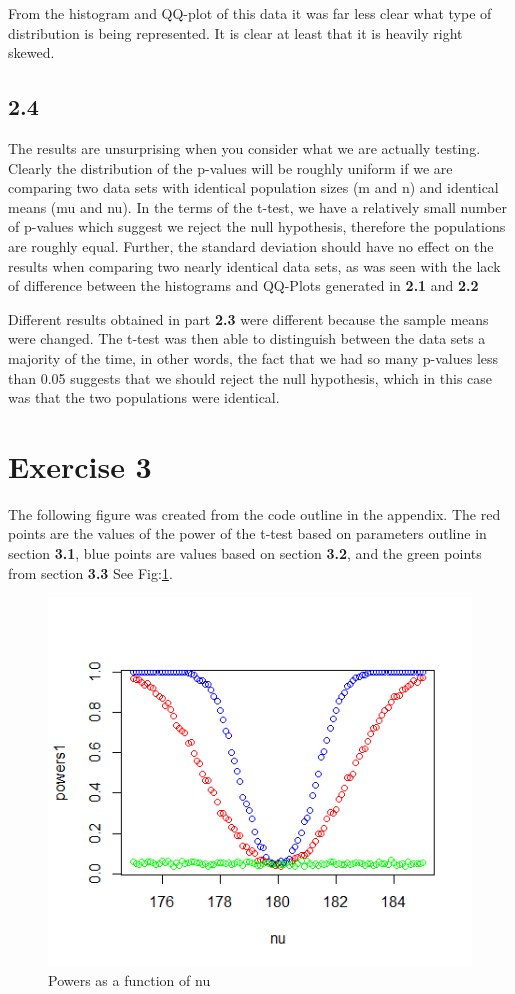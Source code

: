 \documentclass{article}
\begin{document}
      From the histogram and QQ-plot of this data it was far less clear what type of distribution is being represented. It is clear at least that it is heavily right skewed.
      
\newpage
    \subsection{2.4}
      The results are unsurprising when you consider what we are actually testing. Clearly the distribution of the p-values will be roughly uniform if we are comparing two data sets with identical population sizes (m and n) and identical means (mu and nu). In the terms of the t-test, we have a relatively small number of p-values which suggest we reject the null hypothesis, therefore the populations are roughly equal. Further, the standard deviation should have no effect on the results when comparing two nearly identical data sets, as was seen with the lack of difference between the histograms and QQ-Plots generated in \textbf{2.1} and \textbf{2.2}
      
      Different results obtained in part \textbf{2.3} were different because the sample means were changed. The t-test was then able to distinguish between the data sets a majority of the time, in other words, the fact that we had so many p-values less than 0.05 suggests that we should reject the null hypothesis, which in this case was that the two populations were identical.
      
\newpage
  \section{Exercise 3}
  The following figure was created from the code outline in the appendix. The red points are the values of the power of the t-test based on parameters outline in section \textbf{3.1}, blue points are values based on section \textbf{3.2}, and the green points from section \textbf{3.3}
      See Fig:\ref{fig:3_1}.
      \begin{figure}[!htb]
        \centering
        \includegraphics[width=.8\linewidth]{results/3_1}
        \caption{Powers as a function of nu}
        \label{fig:3_1}
      \end{figure}
\end{document}
